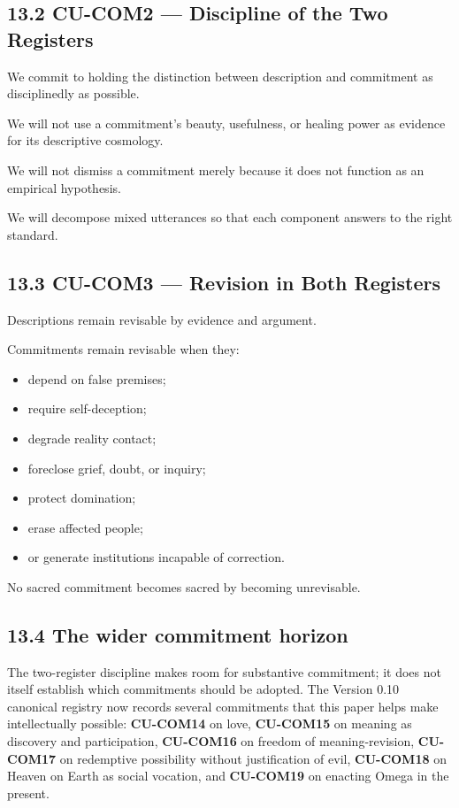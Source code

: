 \documentclass[
  11pt,
]{article}
\providecommand{\tightlist}{%
  \setlength{\itemsep}{0pt}\setlength{\parskip}{0pt}}
\begin{document}
\subsection{13.2 CU-COM2 --- Discipline of the Two
Registers}\label{cu-com2-discipline-of-the-two-registers}

We commit to holding the distinction between description and commitment
as disciplinedly as possible.

We will not use a commitment's beauty, usefulness, or healing power as
evidence for its descriptive cosmology.

We will not dismiss a commitment merely because it does not function as
an empirical hypothesis.

We will decompose mixed utterances so that each component answers to the
right standard.

\subsection{13.3 CU-COM3 --- Revision in Both
Registers}\label{cu-com3-revision-in-both-registers}

Descriptions remain revisable by evidence and argument.

Commitments remain revisable when they:

\begin{itemize}
\tightlist
\item
  depend on false premises;
\item
  require self-deception;
\item
  degrade reality contact;
\item
  foreclose grief, doubt, or inquiry;
\item
  protect domination;
\item
  erase affected people;
\item
  or generate institutions incapable of correction.
\end{itemize}

No sacred commitment becomes sacred by becoming unrevisable.

\subsection{13.4 The wider commitment
horizon}\label{the-wider-commitment-horizon}

The two-register discipline makes room for substantive commitment; it
does not itself establish which commitments should be adopted. The
Version 0.10 canonical registry now records several commitments that
this paper helps make intellectually possible: \textbf{CU-COM14} on
love, \textbf{CU-COM15} on meaning as discovery and participation,
\textbf{CU-COM16} on freedom of meaning-revision, \textbf{CU-COM17} on
redemptive possibility without justification of evil, \textbf{CU-COM18}
on Heaven on Earth as social vocation, and \textbf{CU-COM19} on enacting
Omega in the present.
\end{document}
